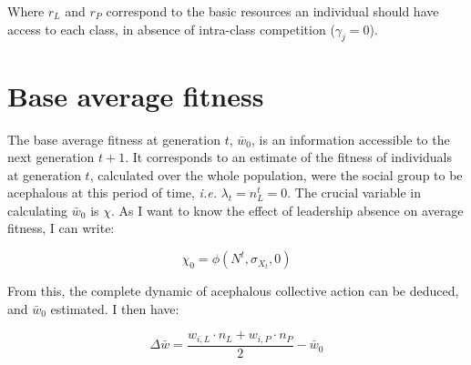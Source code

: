 \documentclass[a4paper]{article}
\begin{document}
Where $r_L$ and $r_P$ correspond to the basic resources an individual should have access to each class, in absence of intra-class competition ($\gamma_j=0$).

\section{Base average fitness}

The base average fitness at generation $t$, $\bar{w}_0$, is an information accessible to the next generation $t+1$. It corresponds to an estimate of the fitness of individuals at generation $t$, calculated over the whole population, were the social group to be acephalous at this period of time, \textit{i.e.} $\lambda_t=n_L^t=0$. The crucial variable in calculating $\bar{w}_0$ is $\chi$. As I want to know the effect of leadership absence on average fitness, I can write:

\begin{equation}
	\chi_0=\phi(N^t,\sigma_{X_t},0)
\end{equation}

From this, the complete dynamic of acephalous collective action can be deduced, and $\bar{w}_0$ estimated. I then have:

\begin{equation}
	\Delta\bar{w}=\frac{w_{i,L}\cdot n_L+w_{i,P}\cdot n_P}{2}-\bar{w}_0
\end{equation}
%
%
\end{document}
